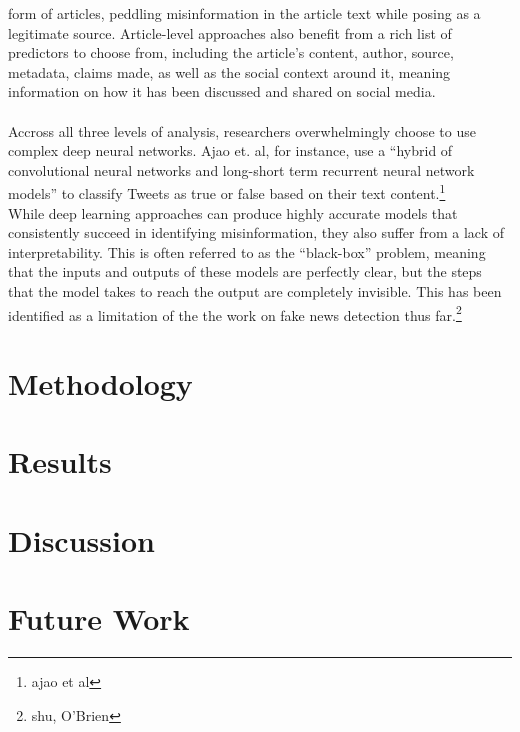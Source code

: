 \documentclass[12pt]{article}
\begin{document}
form of articles, peddling misinformation in the article text while
posing as a legitimate source. Article-level approaches also benefit
from a rich list of predictors to choose from, including the article's
content, author, source, metadata, claims made, as well as the social
context around it, meaning information on how it has been discussed and
shared on social media.\\
~\\
\hspace*{0.333em}\hspace*{0.333em}\hspace*{0.333em}\hspace*{0.333em}\hspace*{0.333em}Accross
all three levels of analysis, researchers overwhelmingly choose to use
complex deep neural networks. Ajao et. al, for instance, use a ``hybrid
of convolutional neural networks and long-short term recurrent neural
network models'' to classify Tweets as true or false based on their text
content.\footnote{ajao et al}\\
\hspace*{0.333em}\hspace*{0.333em}\hspace*{0.333em}\hspace*{0.333em}\hspace*{0.333em}While
deep learning approaches can produce highly accurate models that
consistently succeed in identifying misinformation, they also suffer
from a lack of interpretability. This is often referred to as the
``black-box'' problem, meaning that the inputs and outputs of these
models are perfectly clear, but the steps that the model takes to reach
the output are completely invisible. This has been identified as a
limitation of the the work on fake news detection thus far.\footnote{shu,
  O'Brien}

\section{Methodology}

\section{Results}

\section{Discussion}

\section{Future Work}



\end{document}
